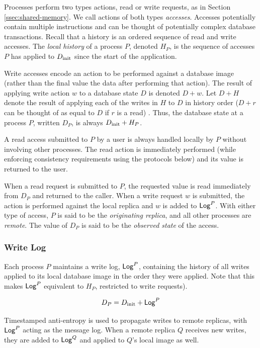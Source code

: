 \documentclass[]             %
{NASA}                       %
\theoremstyle{definition}
\begin{document}
Processes perform two types actions, read or write requests, as in
Section \ref{ssec:shared-memory}. We call actions of both types
\emph{accesses}. Accesses potentially contain multiple instructions
and can be thought of potentially complex database
transactions. Recall that a history is an ordered sequence of read and
write accesses. The \emph{local history} of a process $P$, denoted
$H_P$, is the sequence of accesses $P$ has applied to $D_\textrm{init}$ since
the start of the application.

Write accesses encode an action to be performed against a database
image (rather than the final value the data after performing that
action). The result of applying write action $w$ to a database state
$D$ is denoted $D + w$. Let $D + H$ denote the result of applying each
of the writes in $H$ to $D$ in history order ($D + r$ can be thought
of as equal to $D$ if $r$ is a read) . Thus, the database state
at a process $P$, written $D_P$, is always $D_\textrm{init} + H_P$.

A read access submitted to $P$ by a user is always handled locally by
$P$ without involving other processes. The read action is immediately
performed (while enforcing consistency requirements using the
protocols below) and its value is returned to the user.

When a read request is submitted to $P$, the requested value is read
immediately from $D_P$ and returned to the caller. When a write
request $w$ is submitted, the action is performed against the local
replica and $w$ is added to $\mathsf{Log}^{P}$. With either type of access, $P$
is said to be the \emph{originating replica}, and all other processes
are \emph{remote}. The value of $D_P$ is said to be the \emph{observed
  state} of the access.

\subsubsection{Write Log}
Each process $P$ maintains a write log, $\mathsf{Log}^{P}$, containing the
history of all writes applied to its local database image in the order
they were applied. Note that this makes $\mathsf{Log}^{P}$ equivalent to $H_P$,
restricted to write requests).

\[  D_P = D_\textrm{init} + \mathsf{Log}^{P} \label{eq:conit-DP} \]

Timestamped anti-entropy is used to propagate writes to remote
replicas, with $\mathsf{Log}^{P}$ acting as the message log. When a remote
replica $Q$ receives new writes, they are added to $\mathsf{Log}^{Q}$ and
applied to $Q$'s local image as well.
\end{document}
